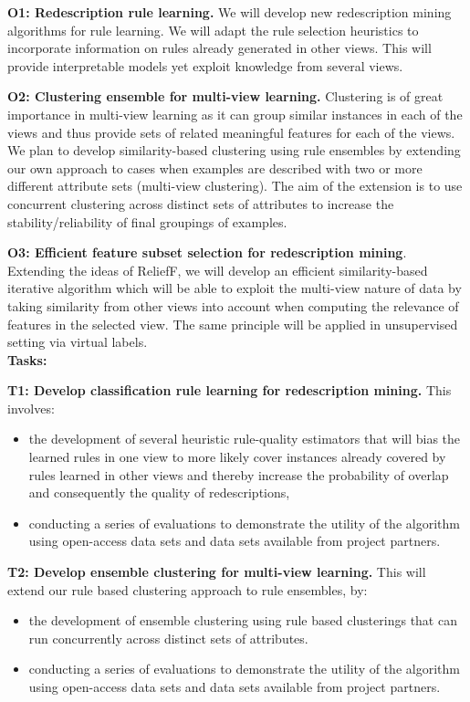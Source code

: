 \documentclass[a4paper,11pt]{article}
\begin{document}
\textbf{O1: Redescription rule learning.} We will develop new redescription mining algorithms for rule learning. We will adapt the rule selection heuristics to incorporate information on rules already generated in other views. This will provide interpretable models yet exploit knowledge from several views.

\textbf{O2: Clustering ensemble for multi-view learning.} Clustering is of great importance in multi-view learning as it can group similar instances in each of the views and thus provide sets of related meaningful features for each of the views. We plan to develop similarity-based clustering using rule ensembles by extending our own approach to cases when examples are described with two or more different attribute sets (multi-view clustering). The aim of the extension is to use concurrent clustering across distinct sets of attributes to increase the stability/reliability of final groupings of examples.

\textbf{O3: Efficient feature subset selection for redescription mining}. Extending the ideas of ReliefF, we will develop an efficient similarity-based iterative algorithm which will be able to exploit the multi-view nature of data by taking similarity from other views into account when computing the relevance of features in the selected view.
The same principle will be applied in unsupervised setting via virtual labels.
%
\\[0,2cm]
\textbf{Tasks:}

\textbf{T1: Develop classification rule learning for redescription mining.} This involves: 
\begin{itemize}
	\item  the development of several heuristic rule-quality estimators that will bias the learned rules in one view to more likely cover instances already covered by rules learned in other views and thereby increase the probability of overlap and consequently the quality of redescriptions,
	\item conducting a series of evaluations to demonstrate the utility of the algorithm using open-access data sets and data sets available from project partners.
\end{itemize}
%
\textbf{T2: Develop ensemble clustering for multi-view learning.} This will extend our rule based clustering approach to rule ensembles, by:
\begin{itemize}
	\item  the development of ensemble clustering using rule based clusterings that can run concurrently across distinct sets of attributes.
   	\item conducting a series of evaluations to demonstrate the utility of the algorithm  using open-access data sets and data sets available from project partners.
\end{itemize}
\end{document}
